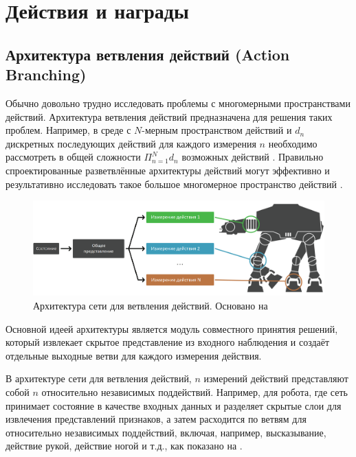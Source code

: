 \section{Действия и награды} \label{ch2:act-rew} %

\subsection{Архитектура ветвления действий (Action Branching)}

Обычно довольно трудно исследовать проблемы с многомерными пространствами действий. Архитектура ветвления действий предназначена для решения таких проблем. Например, в среде с $N$-мерным пространством действий и $d_n$ дискретных последующих действий для каждого измерения $n$ необходимо рассмотреть в общей сложности $\Pi^N_{n=1} d_n$ возможных действий \cite{tavakoli2017action}. Правильно спроектированные разветвлённые архитектуры действий могут эффективно и результативно исследовать такое большое многомерное пространство действий \cite{tavakoli2017action}.

\begin{figure}[ht!]
    \center
    \includegraphics [scale=0.4] {my_folder/images/ch2/action-branching.png}
    \caption{Архитектура сети для ветвления действий. Основано на \cite{tavakoli2017action}}
    \label{fig:ch2-action-branching}
\end{figure}

Основной идеей архитектуры является модуль совместного принятия решений, который извлекает скрытое представление из входного наблюдения и создаёт отдельные выходные ветви для каждого измерения действия.

В архитектуре сети для ветвления действий, $n$ измерений действий представляют собой $n$ относительно независимых поддействий. Например, для робота, где сеть принимает состояние в качестве входных данных и разделяет скрытые слои для извлечения представлений признаков, а затем расходится по ветвям для относительно независимых поддействий, включая, например, высказывание, действие рукой, действие ногой и т.д., как показано на .

